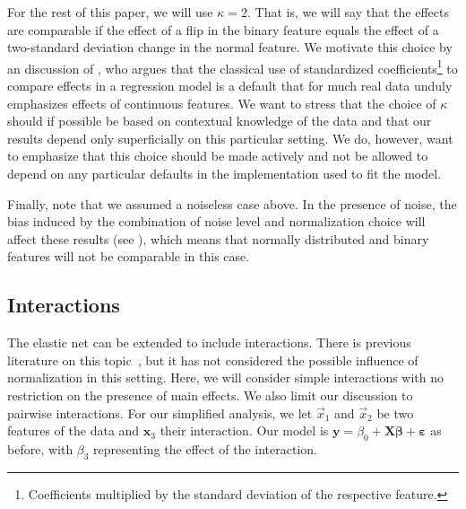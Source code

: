 For the rest of this paper, we will use \(\kappa = 2\). That is, we will say that the
effects are comparable if the effect of a flip in the binary feature equals the effect of a
two-standard deviation change in the normal feature. We motivate this choice by an
discussion of \citet{gelman2008}, who argues that the classical use of standardized
coefficients\footnote{Coefficients multiplied by the standard deviation of the respective
  feature.} to compare effects in a regression model is a default that for much real data
unduly emphasizes effects of continuous features. We want to stress that the choice of
\(\kappa\) should if possible be based on contextual knowledge of the data and that our
results depend only superficially on this particular setting. We do, however, want to
emphasize that this choice should be made actively and not be allowed to depend on any
particular defaults in the implementation used to fit the model.

Finally, note that we assumed a noiseless case above. In the presence of noise, the bias
induced by the combination of noise level and normalization choice will affect these
results (see ), which means that normally distributed and
binary features will not be comparable in this case.

\subsection{Interactions}\label{sec:interactions}

The elastic net can be extended to include interactions. There is previous literature on
this topic~\citep{bien2013,zemlianskaia2022,lim2015}, but it has not considered the
possible influence of normalization in this setting. Here, we will consider simple
interactions with no restriction on the presence of main effects. We also limit our
discussion to pairwise interactions. For our simplified analysis, we let \(\vec{x}_1\) and
\(\vec{x}_2\) be two features of the data and \(\bm{x}_3\) their interaction. Our model is
\(\bm{y}=\beta_0 + \bm{X\beta} + \bm{\varepsilon}\) as before, with \(\beta_3\)
representing the effect of the interaction.

